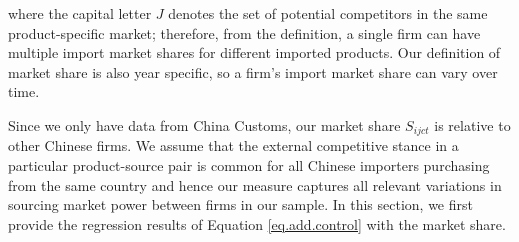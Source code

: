 \documentclass[12pt]{article}
\begin{document}
where the capital letter $J$ denotes the set of potential competitors in the same product-specific market; therefore, from the definition, a single firm can have multiple import market shares for different imported products. Our definition of market share is also year specific, so a firm’s import market share can vary over time. 

Since we only have data from China Customs, our market share $S_{ijct}$ is relative to other Chinese firms. We assume that the external competitive stance in a particular product-source pair is common for all Chinese importers purchasing from the same country and hence our measure captures all relevant variations in sourcing market power between firms in our sample. In this section, we first provide the regression results of Equation \ref{eq.add.control} with the market share. 
\end{document}
